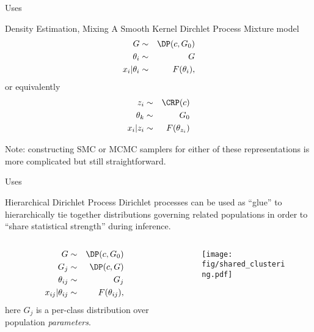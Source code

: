 \begin{frame}[t]{Uses}
\begin{block}{Density Estimation, Mixing A Smooth Kernel}
Dirchlet Process Mixture model \citep{Escobar1995, MacEachern1998, Neal1998}
\begin{eqnarray*}
G &\sim& \DP(c,G_0) \\
\theta_i &\sim& G \\
x_i | \theta_i &\sim& F(\theta_i),
\end{eqnarray*} 
or equivalently%
\begin{eqnarray*}
z_i &\sim& \CRP(c) \\
\theta_k &\sim& G_0 \\
x_i | z_i &\sim& F(\theta_{z_i})
\end{eqnarray*} 

\end{block}

Note: constructing SMC or MCMC samplers for either of these representations is more complicated but still straightforward.
\end{frame}	


\begin{frame}[t]{Uses}
\begin{block}{Hierarchical Dirichlet Process \cite{Teh2006b}}
Dirichlet processes can be used as ``glue'' to hierarchically tie together distributions governing related populations in order to ``share statistical strength'' during inference.
\begin{columns}[t]
\begin{column}{.5\textwidth}
\begin{eqnarray*}
G &\sim& \DP(c,G_0) \\
G_j &\sim& \DP(c,G) \\
\theta_{ij} &\sim& G_j \\
x_{ij} | \theta_{ij} &\sim& F(\theta_{ij}),
\end{eqnarray*} 
\centering
\hspace{.25cm} here $G_j$ is a per-class distribution over population {\em parameters}.
\vspace{2cm}
\end{column}
\begin{column}{.5\textwidth}
\begin{figure}
\begin{center}
\texttt{[image: fig/shared\_clustering.pdf]}
\label{default}
\end{center}
\end{figure}
\end{column}
\end{columns}
\end{block}
\end{frame}	


